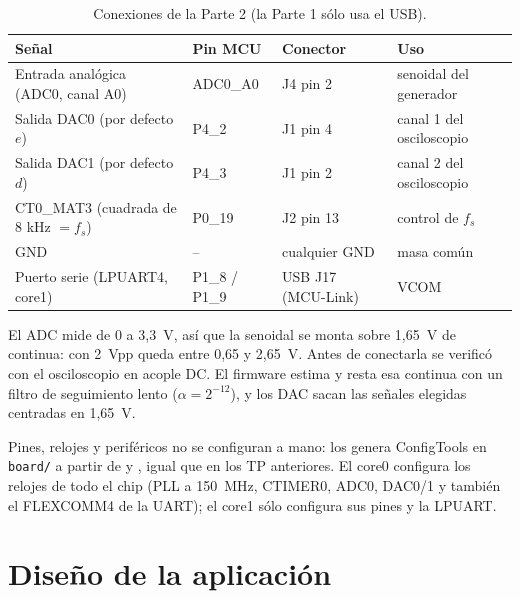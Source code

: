 \documentclass[11pt,a4paper]{article}
\begin{document}
\begin{table}[H]
\centering
\caption{Conexiones de la Parte 2 (la Parte 1 sólo usa el USB).}
\label{tab:pines}
\footnotesize
\begin{tabular}{llll}
\toprule
Señal & Pin MCU & Conector & Uso \\
\midrule
Entrada analógica (ADC0, canal A0) & ADC0\_A0 & J4 pin 2 & senoidal del generador \\
Salida DAC0 (por defecto $e$) & P4\_2 & J1 pin 4 & canal 1 del osciloscopio \\
Salida DAC1 (por defecto $d$) & P4\_3 & J1 pin 2 & canal 2 del osciloscopio \\
CT0\_MAT3 (cuadrada de 8 kHz $= f_s$) & P0\_19 & J2 pin 13 & control de $f_s$ \\
GND & -- & cualquier GND & masa común \\
Puerto serie (LPUART4, core1) & P1\_8 / P1\_9 & USB J17 (MCU-Link) & VCOM \\
\bottomrule
\end{tabular}
\end{table}

El ADC mide de 0 a 3,3~V, así que la senoidal se monta sobre 1,65~V de continua: con 2~Vpp
queda entre 0,65 y 2,65~V. Antes de conectarla se verificó con el osciloscopio en acople DC.
El firmware estima y resta esa continua con un filtro de seguimiento lento ($\alpha = 2^{-12}$),
y los DAC sacan las señales elegidas centradas en 1,65~V.

Pines, relojes y periféricos no se configuran a mano: los genera ConfigTools en
\texttt{board/} a partir de  y , igual que en los
TP anteriores. El core0 configura los relojes de todo el chip (PLL a 150~MHz, CTIMER0, ADC0,
DAC0/1 y también el FLEXCOMM4 de la UART); el core1 sólo configura sus pines y la LPUART.

\newpage

\section{Diseño de la aplicación}
\end{document}
